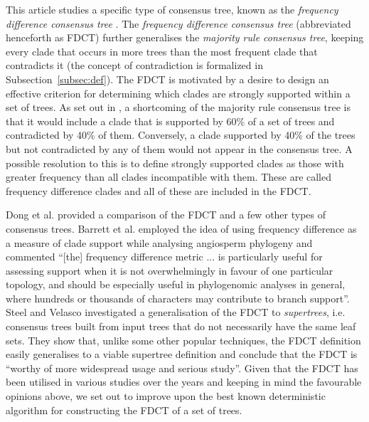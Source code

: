 \documentclass{article}
\begin{document}
    This article studies a specific type of consensus tree, known as the \textit{frequency difference consensus tree} \cite{goloboff2003improvements}. The \textit{frequency difference consensus tree} (abbreviated henceforth as FDCT) further generalises the \textit{majority rule consensus tree}, keeping every clade that occurs in more trees than the most frequent clade that contradicts it (the concept of contradiction is formalized in Subsection~\ref{subsec:def}). The FDCT is motivated by a desire to design an effective criterion for determining which clades are strongly supported within a set of trees. As set out in \cite{goloboff2003improvements}, a shortcoming of the majority rule consensus tree is that it would include a clade that is supported by 60\% of a set of trees and contradicted by 40\% of them. Conversely, a clade supported by 40\% of the trees but not contradicted by any of them would not appear in the consensus tree. A possible resolution to this is to define strongly supported clades as those with greater frequency than all clades incompatible with them. These are called frequency difference clades and all of these are included in the FDCT.

    Dong et al. \cite{dong2010majority} provided a comparison of the FDCT and a few other types of consensus trees. Barrett et al. \cite{barrett2013plastid} employed the idea of using frequency difference as a measure of clade support while analysing angiosperm phylogeny and commented ``[the] frequency difference metric ... is particularly useful for assessing support when it is not overwhelmingly in favour of one particular topology, and should be especially useful in phylogenomic analyses in general, where hundreds or thousands of characters may contribute to branch support''. Steel and Velasco \cite{steel2014axiomatic} investigated a generalisation of the FDCT to \textit{supertrees}, i.e. consensus trees built from input trees that do not necessarily have the same leaf sets. They show that, unlike some other popular techniques, the FDCT definition easily generalises to a viable supertree definition and conclude that the FDCT is ``worthy of more widespread usage and serious study''. Given that the FDCT has been utilised in various studies over the years \cite{garcia2014testing,barrett2013plastid,molineri2010cladistic,molineri2013phylogeny,molineri2015phylogeny,lindqvist2006molecular} and keeping in mind the favourable opinions above, we set out to improve upon the best known deterministic algorithm for constructing the FDCT of a set of trees.
\end{document}
